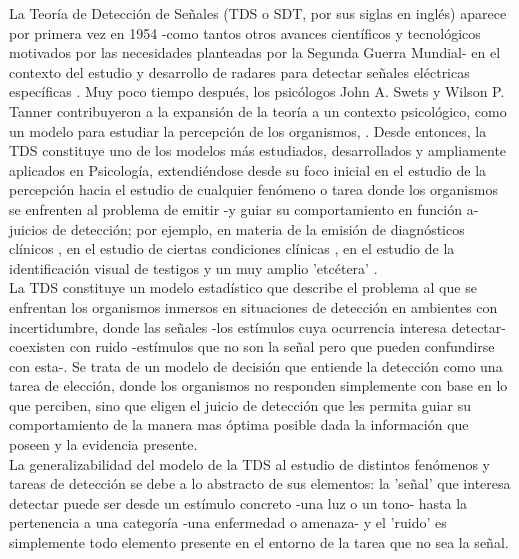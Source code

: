 La Teoría de Detección de Señales (TDS o SDT, por sus siglas en inglés) aparece por primera vez en 1954 -como tantos otros avances científicos y tecnológicos motivados por las necesidades planteadas por la Segunda Guerra Mundial- en el contexto del estudio y desarrollo de radares para detectar señales eléctricas específicas \parencite{Peterson1954}. Muy poco tiempo después, los psicólogos John A. Swets y Wilson P. Tanner contribuyeron a la expansión de la teoría a un contexto psicológico, como un modelo para estudiar la percepción de los organismos, \parencite{Tanner1954, Swets1961}. Desde entonces, la TDS constituye uno de los modelos más estudiados, desarrollados y ampliamente aplicados en Psicología, extendiéndose desde su foco inicial en el estudio de la percepción \parencite{Rosenholtz2001, Pessoa2005, Wallis2007} hacia el estudio de cualquier fenómeno o tarea donde los organismos se enfrenten al problema de emitir -y guiar su comportamiento en función a- juicios de detección; por ejemplo, en materia de la emisión de diagnósticos clínicos \parencite{Grossberg1978, Swets2000, Boutis2010}, en el estudio de ciertas condiciones clínicas \parencite{Westermann2010, Bonnel2003, Brown1994, Naliboff1981}, en el estudio de la identificación visual de testigos \parencite{Gronlund2014, Wixted2014, Wixted2016} y un muy amplio 'etcétera' \parencite{Gordon1974, Nuechterlein1983, Harvey1992, Verghese2001}.\\ 

La TDS constituye un modelo estadístico que describe el problema al que se enfrentan los organismos inmersos en situaciones de detección en ambientes con incertidumbre, donde las señales -los estímulos cuya ocurrencia interesa detectar- coexisten con ruido -estímulos que no son la señal pero que pueden confundirse con esta-. Se trata de un modelo de decisión que entiende la detección como una tarea de elección, donde los organismos no responden simplemente con base en lo que perciben, sino que eligen el juicio de detección que les permita guiar su comportamiento de la manera mas óptima posible dada la información que poseen y la evidencia presente.\\

La generalizabilidad del modelo de la TDS al estudio de distintos fenómenos y tareas de detección se debe a lo abstracto de sus elementos: la 'señal' que interesa detectar puede ser desde un estímulo concreto -una luz o un tono- hasta la pertenencia a una categoría -una enfermedad o amenaza- y el 'ruido' es simplemente todo elemento presente en el entorno de la tarea que no sea la señal.\\ 

